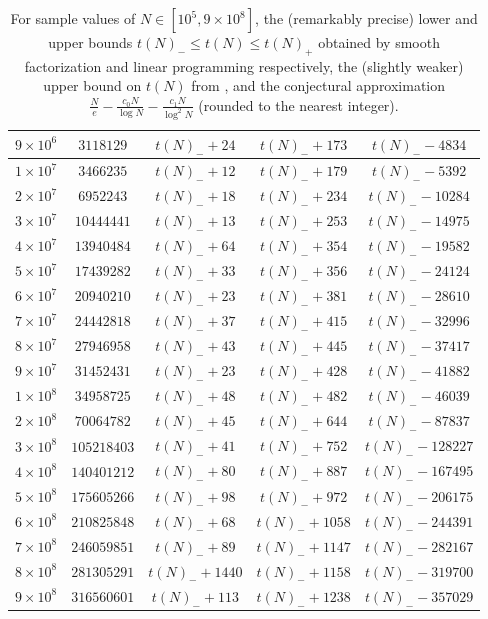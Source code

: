 \documentclass[12pt,a4paper,reqno]{amsart}
\numberwithin{equation}{section}
\theoremstyle{plain}
\theoremstyle{definition}
\begin{document}
\begin{table}[ht]
\begin{tabular}{|c|c|c|c|c|}
$9 \times 10^6$ & $\num{3118129}$ & $t(N)_- + 24$ & $t(N)_- + 173$ & $t(N)_- - \num{4834}$ \\
\hline
\rule{0pt}{12pt}$1 \times 10^7$ & $\num{3466235}$ & $t(N)_- + 12$ & $t(N)_- + 179$ & $t(N)_- - \num{5392}$ \\
$2 \times 10^7$ & $\num{6952243}$ & $t(N)_- + 18$ & $t(N)_- + 234$ & $t(N)_- - \num{10284}$ \\
$3 \times 10^7$ & $\num{10444441}$ & $t(N)_- + 13$ & $t(N)_- + 253$ & $t(N)_- - \num{14975}$ \\
$4 \times 10^7$ & $\num{13940484}$ & $t(N)_- + 64$ & $t(N)_- + 354$ & $t(N)_- - \num{19582}$ \\
$5 \times 10^7$ & $\num{17439282}$ & $t(N)_- + 33$ & $t(N)_- + 356$ & $t(N)_- - \num{24124}$ \\
$6 \times 10^7$ & $\num{20940210}$ & $t(N)_- + 23$ & $t(N)_- + 381$ & $t(N)_- - \num{28610}$ \\
$7 \times 10^7$ & $\num{24442818}$ & $t(N)_- + 37$ & $t(N)_- + 415$ & $t(N)_- - \num{32996}$ \\
$8 \times 10^7$ & $\num{27946958}$ & $t(N)_- + 43$ & $t(N)_- + 445$ & $t(N)_- - \num{37417}$ \\
$9 \times 10^7$ & $\num{31452431}$ & $t(N)_- + 23$ & $t(N)_- + 428$ & $t(N)_- - \num{41882}$ \\
\hline
\rule{0pt}{12pt}$1 \times 10^8$ & $\num{34958725}$ & $t(N)_- + 48$ & $t(N)_- + 482$ & $t(N)_- - \num{46039}$ \\
$2 \times 10^8$ & $\num{70064782}$ & $t(N)_- + 45$ & $t(N)_- + 644$ & $t(N)_- - \num{87837}$ \\
$3 \times 10^8$ & $\num{105218403}$ & $t(N)_- + 41$ & $t(N)_- + 752$ & $t(N)_- - \num{128227}$ \\
$4 \times 10^8$ & $\num{140401212}$ & $t(N)_- + 80$ & $t(N)_- + 887$ & $t(N)_- - \num{167495}$ \\
$5 \times 10^8$ & $\num{175605266}$ & $t(N)_- + 98$ & $t(N)_- + 972$ & $t(N)_- - \num{206175}$ \\
$6 \times 10^8$ & $\num{210825848}$ & $t(N)_- + 68$ & $t(N)_- + 1058$ & $t(N)_- - \num{244391}$ \\
$7 \times 10^8$ & $\num{246059851}$ & $t(N)_- + 89$ & $t(N)_- + 1147$ & $t(N)_- - \num{282167}$ \\
$8 \times 10^8$ & $\num{281305291}$ & $t(N)_- + 1440$ & $t(N)_- + 1158$ & $t(N)_- - \num{319700}$ \\
$9 \times 10^8$ & $\num{316560601}$ & $t(N)_- + 113$ & $t(N)_- + 1238$ & $t(N)_- - \num{357029}$ \\
\hline
\end{tabular}
\bigskip

\caption{For sample values of $N \in [10^5, 9 \times 10^8]$, the (remarkably precise) lower and upper bounds $t(N)_- \leq t(N) \leq t(N)_+$ obtained by smooth factorization and linear programming respectively, the (slightly weaker) upper bound on $t(N)$ from , and the conjectural approximation $\frac{N}{e} - \frac{c_0 N}{\log N} - \frac{c_1N}{\log^2 N}$ (rounded to the nearest integer). }\label{long-table}
\end{table}
\end{document}
